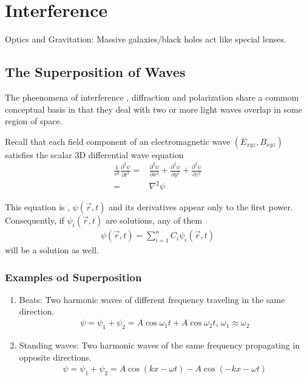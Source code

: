\newpage
\section{Interference}

Optics and Gravitation: Massive galaxies/black holes act like special lenses. 

\subsection{The Superposition of Waves}
The pheenomena of interference , diffraction and polarization share a commom conceptual basis in that they deal with two or more light waves overlap in some region of space. 

Recall that each field component of an electromagnetic wave $(E_{xyz}, B_{xyz})$ satisfies the scalar 3D differential wave equation
\begin{align*}
    \frac{1}{v^2}\frac{\partial^2 \psi }{\partial t^2}=&\frac{\partial^2 \psi }{\partial x^2}+\frac{\partial^2 \psi }{\partial y^2}+\frac{\partial^2 \psi }{\partial z^2}\\
    =&\nabla^2\psi
\end{align*}

This equation is , $\psi(\vec{r},t)$ and its derivatives appear only to the first power. Consequently, if $\psi_i(\vec{r},t)$ are solutions, any  of them 
\begin{align*}
    \psi(\vec{r},t)=\sum_{i=1}^n C_i \psi_i(\vec{r},t)
\end{align*}
will be a solution as well. 

\subsubsection{Examples od Superposition}
\begin{enumerate}
    \item Beats: Two harmonic waves of different frequency traveling in the same direction.
    \begin{align*}
        \psi=\psi_1+\psi_2=A\cos\omega_1 t + A\cos \omega_2 t, \, \omega_1\approx \omega_2 
    \end{align*}
    \item Standing waves: Two harmonic waves of the same frequency propagating in opposite directions.
    \begin{align*}
        \psi=\psi_1+\psi_2=A\cos(kx-\omega t)-A\cos(-kx-\omega t)
    \end{align*}
\end{enumerate}

